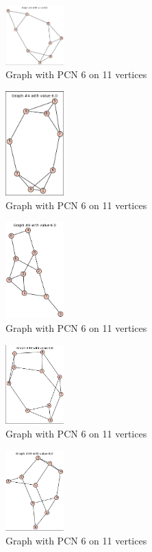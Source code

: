 \documentclass[12pt,a4paper]{amsart}
\theoremstyle{definition}
\theoremstyle{plain}
\begin{document}
\begin{figure}[h]
    \centering
    \includegraphics[width=0.2\textwidth]{Images/1}
    \caption{Graph with PCN 6 on 11 vertices}
\end{figure}
\begin{figure}[h]
    \centering
    \includegraphics[width=0.2\textwidth]{Images/2}
    \caption{Graph with PCN 6 on 11 vertices}
\end{figure}
\begin{figure}[h]
    \centering
    \includegraphics[width=0.2\textwidth]{Images/3}
    \caption{Graph with PCN 6 on 11 vertices}
\end{figure}
\begin{figure}[h]
    \centering
    \includegraphics[width=0.2\textwidth]{Images/4}
    \caption{Graph with PCN 6 on 11 vertices}
\end{figure}
\begin{figure}[h]
    \centering
    \includegraphics[width=0.2\textwidth]{Images/5}
    \caption{Graph with PCN 6 on 11 vertices}
\end{figure}
\end{document}
